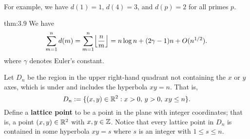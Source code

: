 For example, we have $d(1) = 1$, $d(4) = 3$, and $d(p) = 2$ for all primes $p$. 

\begin{theo}{thm:3.9}
We have 
\[ \sum_{m=1}^n d(m) = \sum_{m=1}^n \floor*{\frac nm} = n\log n + (2\gamma - 1)n + O(n^{1/2}). \]
where $\gamma$ denotes Euler's constant. 
\end{theo}
\begin{pf}
Let $D_n$ be the region in the upper right-hand quadrant not containing the $x$ or $y$ axes, 
which is under and includes the hyperbola $xy = n$. That is, 
\[ D_n := \{(x, y) \in \mathbb{R}^2 : x > 0,\, y > 0,\, xy \leq n\}. \]
Define a {\bf lattice point} to be a point in the plane with integer coordinates; that is, a point 
$(x, y) \in \mathbb{R}^2$ with $x, y \in \mathbb{Z}$. Notice that every lattice point in $D_n$ is contained in 
some hyperbola $xy = s$ where $s$ is an integer with $1 \leq s \leq n$. 


\end{pf}
